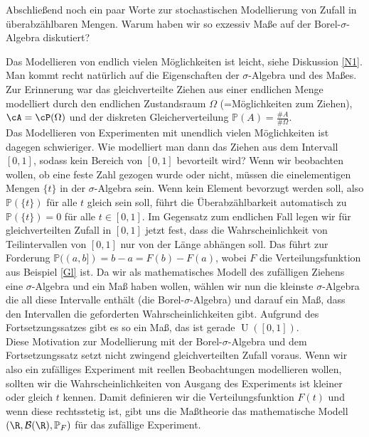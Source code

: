 Abschlie\ss end noch ein paar Worte zur stochastischen Modellierung von Zufall in \"uberabz\"ahlbaren Mengen. Warum haben wir so exzessiv Ma\ss e auf der Borel-$\sigma$-Algebra diskutiert?
\begin{disc}
	Das Modellieren von endlich vielen Möglichkeiten ist leicht, siehe Diskussion \ref{N1}. Man kommt recht nat\"urlich auf die Eigenschaften der $\sigma$-Algebra und des Ma\ss es. Zur Erinnerung war das gleichverteilte Ziehen aus einer endlichen Menge modelliert durch den endlichen Zustandsraum $\Omega$ (=M\"oglichkeiten zum Ziehen), $\cA = \cP(\Omega)$ und der diskreten Gleicherverteilung $\mathbb{P}(A) = \frac{\# A}{\# \Omega}$.\\ Das Modellieren von Experimenten mit unendlich vielen Möglichkeiten ist dagegen schwieriger. Wie modelliert man dann das Ziehen aus dem Intervall $[0,1]$, sodass kein Bereich von $[0,1]$ bevorteilt wird? Wenn wir beobachten wollen, ob eine feste Zahl gezogen wurde oder nicht, m\"ussen die einelementigen Mengen $\{t\}$ in der $\sigma$-Algebra sein. Wenn kein Element bevorzugt werden soll, also $\mathbb P(\{t\})$ f\"ur alle $t$ gleich sein soll, f\"uhrt die \"Uberabz\"ahlbarkeit automatisch zu $\mathbb P(\{t\})=0$ f\"ur alle $t\in [0,1]$. Im Gegensatz zum endlichen Fall legen wir f\"ur gleichverteilten Zufall in $[0,1]$ jetzt fest, dass die Wahrscheinlichkeit von Teilintervallen von $[0,1]$ nur von der L\"ange abh\"angen soll. Das f\"uhrt zur Forderung $\mathbb P((a,b])=b-a=F(b)-F(a)$, wobei $F$ die Verteilungsfunktion aus Beispiel \ref{Gl} ist. Da wir als mathematisches Modell des zuf\"alligen Ziehens eine $\sigma$-Algebra und ein Ma\ss{} haben wollen, w\"ahlen wir nun die kleinste $\sigma$-Algebra die all diese Intervalle enth\"alt (die Borel-$\sigma$-Algebra) und darauf ein Ma\ss, dass den Intervallen die geforderten Wahrscheinlichkeiten gibt. Aufgrund des Fortsetzungssatzes gibt es so ein Ma\ss, das ist gerade $\operatorname U([0,1])$.\\	
	Diese Motivation zur Modellierung mit der Borel-$\sigma$-Algebra und dem Fortsetzungssatz setzt nicht zwingend gleichverteilten Zufall voraus. Wenn wir also ein zuf\"alliges Experiment mit reellen Beobachtungen modellieren wollen, sollten wir die Wahrscheinlichkeiten von \glqq Ausgang des Experiments ist kleiner oder gleich $t$\grqq{} kennen. Damit definieren wir die Verteilungsfunktion $F(t)$ und wenn diese rechtsstetig ist, gibt uns die Ma\ss theorie das mathematische Modell $(\R, \mathcal B(\R), \mathbb P_F)$ f\"ur das zuf\"allige Experiment.	
\end{disc}

